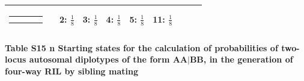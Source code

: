 \documentclass[9pt,letterpaper,twoside]{article}
\begin{document}
{\begin{center}
\begin{tabular}{ccclllllll}
{\renewcommand{\arraystretch}{0.3}
\renewcommand{\tabcolsep}{0.5mm}
\parbox[b][3mm][c]{12mm}{
\begin{tabular}{|p{2mm}|p{2mm}||p{2mm}|p{2mm}|} \hline
$\bullet$ &           &           & $\circ  $ \\
          & $\circ  $ & $\bullet$ &           \\ \hline
\end{tabular}}}
&
& 2: $\frac{1}{8}$
& 3: $\frac{1}{8}$
& 4: $\frac{1}{8}$
& 5: $\frac{1}{8}$
& 11: $\frac{1}{8}$
& & \\
\hline
\end{tabular}
\end{center}
}


\newpage

\noindent \textbf{Table S15 {\color{white} n} Starting states for the calculation of
probabilities of two-locus autosomal diplotypes of the form $\boldsymbol{AA|BB}$, 
in the generation of four-way RIL by sibling mating}

\bigskip
\end{document}

